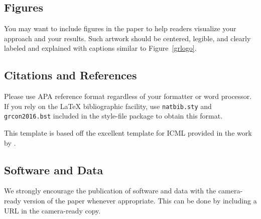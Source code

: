 \documentclass{article}
\begin{document}
\subsection{Figures}
 
You may want to include figures in the paper to help readers visualize
your approach and your results. Such artwork should be centered,
legible, and clearly labeled and explained with captions similar to Figure~\ref{grlogo}.

\subsection{Citations and References} 

Please use APA reference format regardless of your formatter
or word processor. If you rely on the \LaTeX\/ bibliographic 
facility, use {\tt natbib.sty} and {\tt grcon2016.bst} 
included in the style-file package to obtain this format.

This template is based off the excellent template for ICML provided
in the work by \cite{langley00}.

\subsection{Software and Data}

We strongly encourage the publication of software and data with the
camera-ready version of the paper whenever appropriate.  This can be
done by including a URL in the camera-ready copy.  



\end{document}
